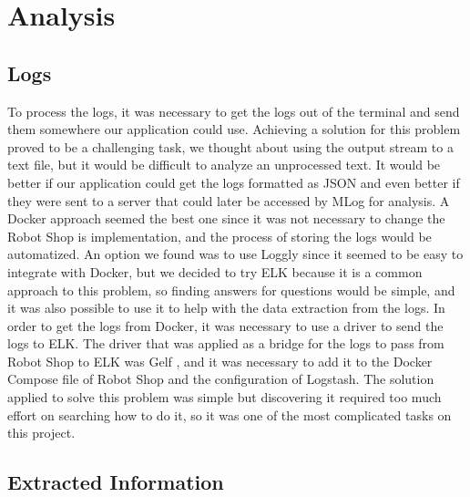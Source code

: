 \section{Analysis}

\subsection{Logs}

To process the logs, it was necessary to get the logs out of the terminal and send them somewhere our application could use. Achieving a solution for this problem proved to be a challenging task, we thought about using the output stream to a text file, but it would be difficult to analyze an unprocessed text. It would be better if our application could get the logs formatted as JSON and even better if they were sent to a server that could later be accessed by MLog for analysis.
A Docker \cite{docker} approach seemed the best one since it was not necessary to change the Robot Shop is implementation, and the process of storing the logs would be automatized. An option we found was to use Loggly \cite{loggly} since it seemed to be easy to integrate with Docker, but we decided to try ELK because it is a common approach to this problem, so finding answers for questions would be simple, and it was also possible to use it to help with the data extraction from the logs.
In order to get the logs from Docker, it was necessary to use a driver to send the logs to ELK. The driver that was applied as a bridge for the logs to pass from Robot Shop to ELK was Gelf \cite{gelfdriver}, and it was necessary to add it to the Docker Compose \cite{dockercompose} file of Robot Shop and the configuration of Logstash.
The solution applied to solve this problem was simple but discovering it required too much effort on searching how to do it, so it was one of the most complicated tasks on this project.

\subsection{Extracted Information}

